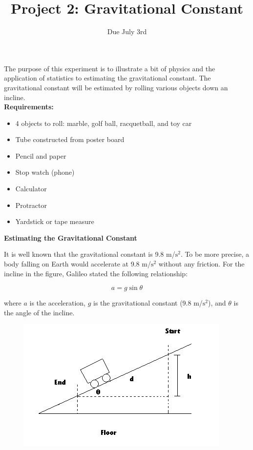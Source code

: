 \documentclass[12pt]{article}
\begin{document}
 
\title{Project 2: Gravitational Constant}
\date{Due July 3rd}

\maketitle

The purpose of this experiment is to illustrate a bit of physics and the application of statistics to estimating the gravitational constant. The gravitational constant will be estimated by rolling various objects down an incline. \\

\noindent
\textbf{Requirements:}

\begin{itemize}
	\item 4 objects to roll: marble, golf ball, racquetball, and toy car
	\item Tube constructed from poster board
	\item Pencil and paper
	\item Stop watch (phone)
	\item Calculator
	\item Protractor
	\item Yardstick or tape measure
\end{itemize}

\noindent
\textbf{Estimating the Gravitational Constant}

It is well known that the gravitational constant is 9.8 m/$\text{s}^2$. To be more precise, a body falling on Earth would accelerate at 9.8 m/$\text{s}^2$ without any friction. For the incline in the figure, Galileo stated the following relationship:

\begin{equation}
	a = g \sin{\theta}
\end{equation}

\noindent where $a$ is the acceleration, $g$ is the gravitational constant (9.8 m/$\text{s}^2$), and $\theta$ is the angle of the incline.

\begin{figure}[h]
	\includegraphics[scale=1]{incline}
\end{figure}
\end{document}
